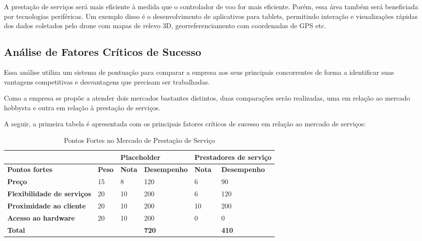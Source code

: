 A prestação de serviços será mais eficiente à medida que o controlador de voo for mais eficiente. Porém, 
essa área também será beneficiada por tecnologias periféricas. Um exemplo disso é o desenvolvimento de 
aplicativos para tablets, permitindo interação e visualizações rápidas dos dados coletados pelo drone com 
mapas de relevo 3D, georreferenciamento com coordenadas de GPS etc.

\subsection{Análise de Fatores Críticos de Sucesso}

Essa análise utiliza um sistema de pontuação para comparar a empresa aos seus principais concorrentes de 
forma a identificar suas vantagens competitivas e desvantagens que precisam ser trabalhadas.

Como a empresa se propõe a atender dois mercados bastantes distintos, duas comparações serão realizadas, 
uma em relação ao mercado hobbysta e outra em relação à prestação de serviços.

A seguir, a primeira tabela é apresentada com os principais fatores críticos de sucesso em relação ao 
mercado de serviços:

\begin{table}[!htbp]
	\centering
	\begin{tabular}{ll|l|l|l|l|}
		\cline{3-6}
		&      & \multicolumn{2}{l|}{\textbf{Placeholder}} & \multicolumn{2}{l|}{\textbf{Prestadores de serviço}} \\ \hline
		\multicolumn{1}{|l|}{\textbf{Pontos fortes}}             & \textbf{Peso} & \textbf{Nota}         & \textbf{Desempenho}        & \textbf{Nota}              & \textbf{Desempenho}              \\ \hline
		\multicolumn{1}{|l|}{\textbf{Preço}}                     & 15   & 8            & 120               & 6                 & 90                      \\ \hline
		\multicolumn{1}{|l|}{\textbf{Flexibilidade de serviços}} & 20   & 10           & 200               & 6                 & 120                     \\ \hline
		\multicolumn{1}{|l|}{\textbf{Proximidade ao cliente}}    & 20   & 10           & 200               & 10                & 200                     \\ \hline
		\multicolumn{1}{|l|}{\textbf{Acesso ao hardware}}        & 20   & 10           & 200               & 0                 & 0                       \\ \hline
		\multicolumn{1}{|l|}{\textbf{Total}}                     &      &              & \textbf{720}               &                   & \textbf{410}                     \\ \hline
	\end{tabular}
	\label{pontoForteServico}
	\caption{Pontos Fortes no Mercado de Prestação de Serviço}
\end{table}


